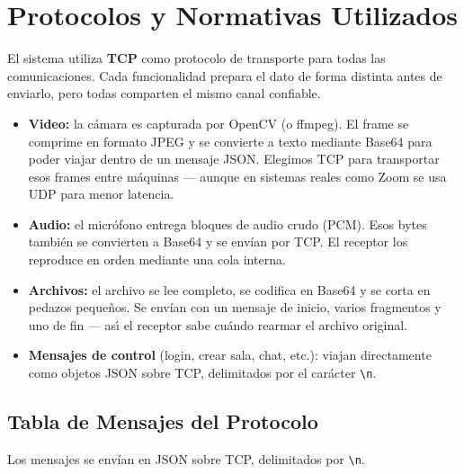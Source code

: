 \documentclass[12pt,a4paper]{article}
\begin{document}
\section{Protocolos y Normativas Utilizados}

El sistema utiliza \textbf{TCP} como protocolo de transporte para todas las comunicaciones. Cada funcionalidad prepara el dato de forma distinta antes de enviarlo, pero todas comparten el mismo canal confiable.

\begin{itemize}
    \item \textbf{Video:} la c\'amara es capturada por OpenCV (o ffmpeg). El frame se comprime en formato JPEG y se convierte a texto mediante Base64 para poder viajar dentro de un mensaje JSON. Elegimos TCP para transportar esos frames entre m\'aquinas --- aunque en sistemas reales como Zoom se usa UDP para menor latencia.
    \item \textbf{Audio:} el micr\'ofono entrega bloques de audio crudo (PCM). Esos bytes tambi\'en se convierten a Base64 y se env\'ian por TCP. El receptor los reproduce en orden mediante una cola interna.
    \item \textbf{Archivos:} el archivo se lee completo, se codifica en Base64 y se corta en pedazos peque\~nos. Se env\'ian con un mensaje de inicio, varios fragmentos y uno de fin --- as\'{\i} el receptor sabe cu\'ando rearmar el archivo original.
    \item \textbf{Mensajes de control} (login, crear sala, chat, etc.): viajan directamente como objetos JSON sobre TCP, delimitados por el car\'acter \verb|\n|.
\end{itemize}

\subsection{Tabla de Mensajes del Protocolo}

Los mensajes se env\'ian en JSON sobre TCP, delimitados por \verb|\n|.
\end{document}
